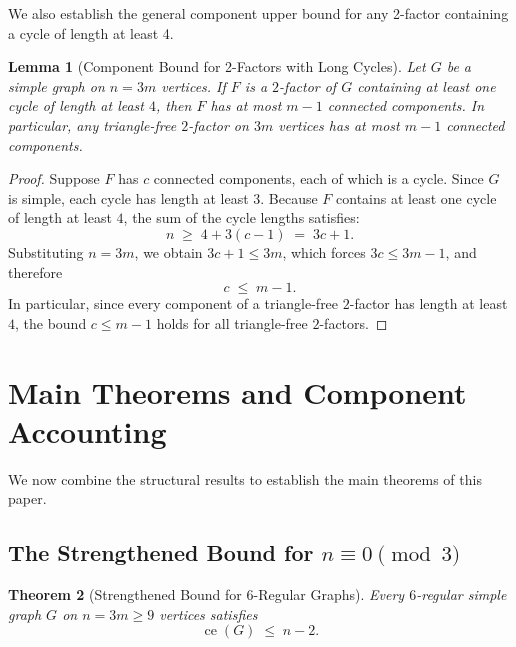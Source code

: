 \documentclass[11pt,reqno]{amsart}
\newtheorem{theorem}{Theorem}[section]
\newtheorem{lemma}[theorem]{Lemma}
\theoremstyle{definition}
\theoremstyle{remark}
\DeclareMathOperator{\ce}{ce}
\begin{document}
We also establish the general component upper bound for any 2-factor containing a cycle of length at least 4.

\begin{lemma}[Component Bound for 2-Factors with Long Cycles]\label{lem:component-bound}
Let $G$ be a simple graph on $n = 3m$ vertices. If $F$ is a $2$-factor of $G$ containing at least one cycle of length at least $4$, then $F$ has at most $m - 1$ connected components. In particular, any triangle-free $2$-factor on $3m$ vertices has at most $m - 1$ connected components.
\end{lemma}

\begin{proof}
Suppose $F$ has $c$ connected components, each of which is a cycle. Since $G$ is simple, each cycle has length at least $3$. Because $F$ contains at least one cycle of length at least $4$, the sum of the cycle lengths satisfies:
\[
n \;\ge\; 4 + 3(c - 1) \;=\; 3c + 1.
\]
Substituting $n = 3m$, we obtain $3c + 1 \le 3m$, which forces $3c \le 3m - 1$, and therefore
\[
c \;\le\; m - 1.
\]
In particular, since every component of a triangle-free $2$-factor has length at least $4$, the bound $c \le m - 1$ holds for all triangle-free $2$-factors.
\end{proof}

\section{Main Theorems and Component Accounting}\label{sec:main-theorems}

We now combine the structural results to establish the main theorems of this paper.

\subsection{The Strengthened Bound for $n \equiv 0 \pmod 3$}

\begin{theorem}[Strengthened Bound for 6-Regular Graphs]\label{thm:ce-n-minus-2}
Every $6$-regular simple graph $G$ on $n = 3m \ge 9$ vertices satisfies
\[
\ce(G) \;\le\; n - 2.
\]
\end{theorem}
\end{document}
